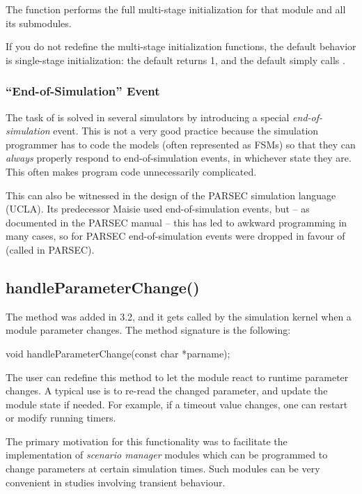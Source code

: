 The  function performs the full multi-stage initialization
for that module and all its submodules.

If you do not redefine the multi-stage initialization functions, the
default behavior is single-stage initialization: the default
 returns 1, and the default 
simply calls .


\subsubsection{``End-of-Simulation'' Event}


The task of  is solved in several simulators
by introducing a special \textit{end-of-simulation} event.
This is not a very good practice because the simulation programmer has to
code the models (often represented as FSMs) so that they can \textit{always}
properly respond to end-of-simulation events, in whichever state they are. This
often makes program code unnecessarily complicated.

This can also be witnessed in the design of the PARSEC
simulation language (UCLA). Its predecessor Maisie used
end-of-simulation events, but -- as documented in the PARSEC manual --
this has led to awkward programming in many cases, so for PARSEC
end-of-simulation events were dropped in favour of 
(called  in PARSEC).


\subsection{handleParameterChange()}
\label{sec:simple-modules:handleParameterChange}

The  method was added in {\opp} 3.2,
and it gets called by the simulation kernel when a module parameter changes.
The method signature is the following:

\begin{cpp}
void handleParameterChange(const char *parname);
\end{cpp}

The user can redefine this method to let the module react to runtime parameter
changes. A typical use is to re-read the changed parameter, and update
the module state if needed. For example, if a timeout value changes,
one can restart or modify running timers.

The primary motivation for this functionality was to facilitate
the implementation of \textit{scenario manager} modules which
can be programmed to change parameters at certain simulation times.
Such modules can be very convenient in studies involving transient behaviour.

